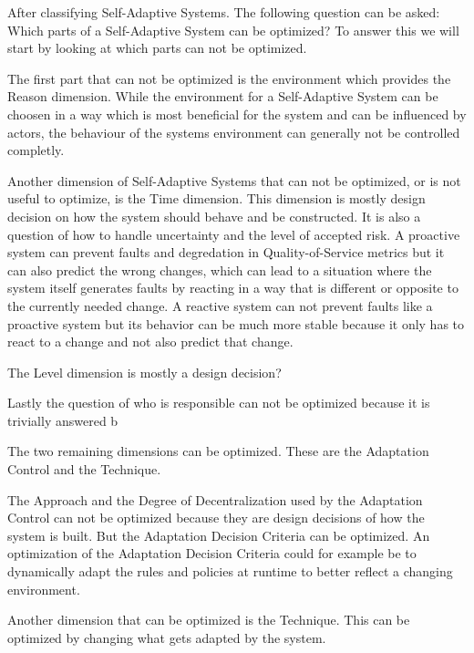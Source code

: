 
After classifying Self-Adaptive Systems.
The following question can be asked: Which parts of a Self-Adaptive System can be optimized?
To answer this we will start by looking at which parts can not be optimized. %

The first part that can not be optimized is the environment which provides the Reason dimension.
While the environment for a Self-Adaptive System can be choosen in a way which is most beneficial for the system
and can be influenced by actors, %
the behaviour of the systems environment can generally not be controlled completly.

Another dimension of Self-Adaptive Systems that can not be optimized, or is not useful to optimize,
is the Time dimension. This dimension is mostly design decision on how the system should behave and be constructed.
It is also a question of how to handle uncertainty and the level of accepted risk.
A proactive system can prevent faults and degredation in Quality-of-Service metrics 
but it can also predict the wrong changes, which can lead to a situation where the system itself generates faults by
reacting in a way that is different or opposite to the currently needed change. %
A reactive system can not prevent faults like a proactive system
but its behavior can be much more stable because it only has to react to a change and not also predict that change.

The Level dimension is mostly a design decision?

Lastly the question of who is responsible can not be optimized because it is trivially answered b


The two remaining dimensions can be optimized. These are the Adaptation Control and the Technique.

The Approach and the Degree of Decentralization used by the Adaptation Control can not be optimized 
because they are design decisions of how the system is built.
But the Adaptation Decision Criteria can be optimized. An optimization of the Adaptation Decision Criteria
could for example be to dynamically adapt the rules and policies at runtime to better reflect a changing environment.

Another dimension that can be optimized is the Technique. 
This can be optimized by changing what gets adapted by the system.

